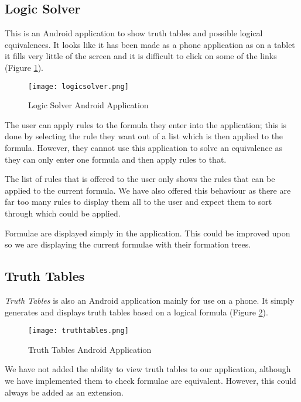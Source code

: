 \documentclass[draft]{report}
\begin{document}
\subsection{Logic Solver}

This is an Android application to show truth tables and possible logical equivalences. It looks like it has been made as a phone application as on a tablet it fills very little of the screen and it is difficult to click on some of the links (Figure \ref{logicsolver}).

\begin{figure}[ht!]
    \centering
    \texttt{[image: logicsolver.png]}
    \caption{Logic Solver Android Application}
    \label{logicsolver}
\end{figure}

The user can apply rules to the formula they enter into the application; this is done by selecting the rule they want out of a list which is then applied to the formula. However, they cannot use this application to solve an equivalence as they can only enter one formula and then apply rules to that.

The list of rules that is offered to the user only shows the rules that can be applied to the current formula. We have also offered this behaviour as there are far too many rules to display them all to the user and expect them to sort through which could be applied.

Formulae are displayed simply in the application. This could be improved upon so we are displaying the current formulae with their formation trees.

\subsection{Truth Tables}

\emph{Truth Tables} is also an Android application mainly for use on a phone. It simply generates and displays truth tables based on a logical formula (Figure \ref{truthtables}).

\begin{figure}[ht!]
    \centering
    \texttt{[image: truthtables.png]}
    \caption{Truth Tables Android Application}
    \label{truthtables}
\end{figure}

We have not added the ability to view truth tables to our application, although we have implemented them to check formulae are equivalent. However, this could always be added as an extension.
\end{document}
